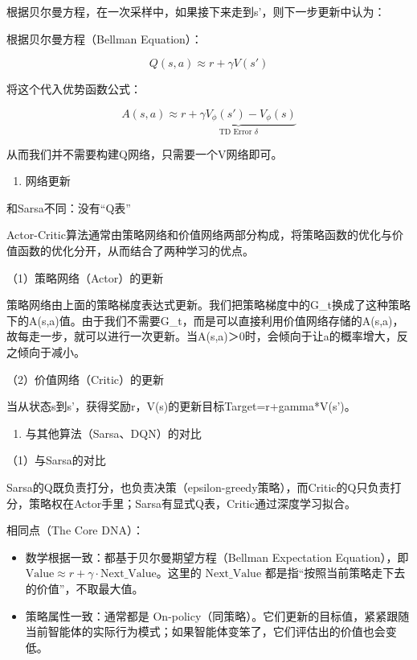 根据贝尔曼方程，在一次采样中，如果接下来走到s'，则下一步更新中认为：

根据贝尔曼方程（Bellman Equation）：

\[
Q(s,a)\approx r+\gamma V(s')
\]

将这个代入优势函数公式：

\[
A(s,a)\approx \underbrace{r+\gamma V_\phi(s')-V_\phi(s)}_{\text{TD Error }\delta}
\]

从而我们并不需要构建Q网络，只需要一个V网络即可。

\begin{enumerate}
\def\labelenumi{\arabic{enumi}.}
\setcounter{enumi}{2}
\tightlist
\item
  网络更新
\end{enumerate}

和Sarsa不同：没有``Q表''

Actor-Critic算法通常由策略网络和价值网络两部分构成，将策略函数的优化与价值函数的优化分开，从而结合了两种学习的优点。

（1）策略网络（Actor）的更新

策略网络由上面的策略梯度表达式更新。我们把策略梯度中的G\_t换成了这种策略下的A(s,a)值。由于我们不需要G\_t，而是可以直接利用价值网络存储的A(s,a)，故每走一步，就可以进行一次更新。当A(s,a)＞0时，会倾向于让a的概率增大，反之倾向于减小。

（2）价值网络（Critic）的更新

当从状态s到s'，获得奖励r，V(s)的更新目标Target=r+gamma*V(s')。

\begin{enumerate}
\def\labelenumi{\arabic{enumi}.}
\setcounter{enumi}{3}
\tightlist
\item
  与其他算法（Sarsa、DQN）的对比
\end{enumerate}

（1）与Sarsa的对比

Sarsa的Q既负责打分，也负责决策（epsilon-greedy策略），而Critic的Q只负责打分，策略权在Actor手里；Sarsa有显式Q表，Critic通过深度学习拟合。

相同点（The Core DNA）：

\begin{itemize}
\tightlist
\item
  数学根据一致：都基于贝尔曼期望方程（Bellman Expectation Equation），即 \(\mathrm{Value}\approx r+\gamma\cdot\mathrm{Next\_Value}\)。这里的 \(\mathrm{Next\_Value}\) 都是指``按照当前策略走下去的价值''，不取最大值。
\item
  策略属性一致：通常都是 On-policy（同策略）。它们更新的目标值，紧紧跟随当前智能体的实际行为模式；如果智能体变笨了，它们评估出的价值也会变低。
\end{itemize}

